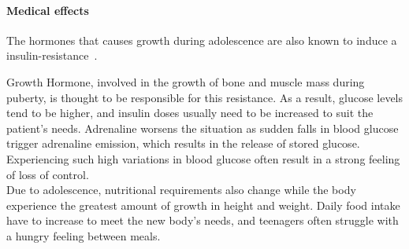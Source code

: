 \paragraph{Medical effects}
The hormones that causes growth during adolescence are also known to induce a insulin-resistance~\cite{HelpChildTeenTD1}.


Growth Hormone, involved in the growth of bone and muscle mass during puberty, is thought to be responsible for this resistance. As a result, glucose levels tend to be higher, and insulin doses usually need to be increased to suit the patient's needs. 
Adrenaline worsens the situation as sudden falls in blood glucose trigger adrenaline emission, which results in the release of stored glucose. 
Experiencing such high variations in blood glucose often result in a strong feeling of loss of control.\\

Due to adolescence, nutritional requirements also change while the body experience the greatest amount of growth in height and weight. Daily food intake have to increase to meet the new body's needs, and teenagers often struggle with a hungry feeling between meals.  


